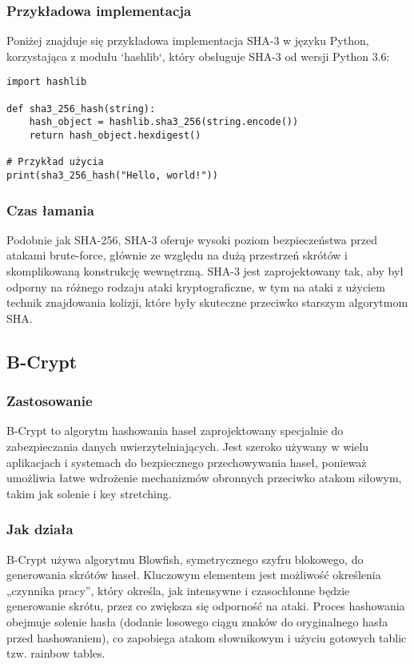 \documentclass[12pt,a4paper]{article}
\begin{document}
\subsubsection{Przykładowa implementacja}
Poniżej znajduje się przykładowa implementacja SHA-3 w języku Python, korzystająca z modułu `hashlib`, który obsługuje SHA-3 od wersji Python 3.6:

\begin{verbatim}
import hashlib

def sha3_256_hash(string):
    hash_object = hashlib.sha3_256(string.encode())
    return hash_object.hexdigest()

# Przykład użycia
print(sha3_256_hash("Hello, world!"))
\end{verbatim}

\subsubsection{Czas łamania}
Podobnie jak SHA-256, SHA-3 oferuje wysoki poziom bezpieczeństwa przed atakami brute-force, głównie ze względu na dużą przestrzeń skrótów i skomplikowaną konstrukcję wewnętrzną. SHA-3 jest zaprojektowany tak, aby był odporny na różnego rodzaju ataki kryptograficzne, w tym na ataki z użyciem technik znajdowania kolizji, które były skuteczne przeciwko starszym algorytmom SHA.

\subsection{B-Crypt}
\subsubsection{Zastosowanie}
B-Crypt to algorytm hashowania haseł zaprojektowany specjalnie do zabezpieczania danych uwierzytelniających. Jest szeroko używany w wielu aplikacjach i systemach do bezpiecznego przechowywania haseł, ponieważ umożliwia łatwe wdrożenie mechanizmów obronnych przeciwko atakom siłowym, takim jak solenie i key stretching.

\subsubsection{Jak działa}
B-Crypt używa algorytmu Blowfish, symetrycznego szyfru blokowego, do generowania skrótów haseł. Kluczowym elementem jest możliwość określenia „czynnika pracy”, który określa, jak intensywne i czasochłonne będzie generowanie skrótu, przez co zwiększa się odporność na ataki. Proces hashowania obejmuje solenie hasła (dodanie losowego ciągu znaków do oryginalnego hasła przed hashowaniem), co zapobiega atakom słownikowym i użyciu gotowych tablic tzw. rainbow tables.
\end{document}
